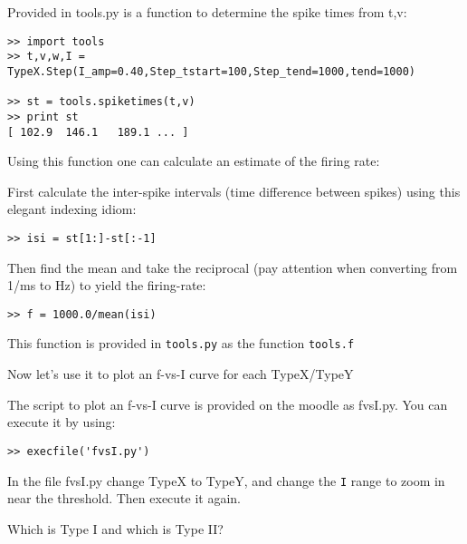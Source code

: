 \documentclass[12pt]{article}
\begin{document}
\begin{Exercise}[]
Provided in tools.py is a function to determine the spike times from
t,v:

\begin{verbatim}
>> import tools
>> t,v,w,I = TypeX.Step(I_amp=0.40,Step_tstart=100,Step_tend=1000,tend=1000)

>> st = tools.spiketimes(t,v)
>> print st
[ 102.9  146.1   189.1 ... ]
\end{verbatim}

Using this function one can calculate an estimate of the firing rate:

First calculate the inter-spike intervals (time difference between
spikes) using this elegant indexing idiom:

\verb^>> isi = st[1:]-st[:-1]^

Then find the mean and take the reciprocal (pay attention when converting from 1/ms to
Hz) to yield the firing-rate:

\begin{verbatim}
>> f = 1000.0/mean(isi)
\end{verbatim}

This function is provided in \verb^tools.py^ as the function \verb^tools.f^

Now let's use it to plot an f-vs-I curve for each TypeX/TypeY

The script to plot an f-vs-I curve is
provided on the moodle as fvsI.py. You can execute it by using:

\begin{verbatim}
>> execfile('fvsI.py')
\end{verbatim}

\Question In the file fvsI.py change TypeX to TypeY, and change the \verb^I^ range to zoom in near the threshold. Then execute it again.

Which is Type I and which is Type II?

\end{Exercise}
\end{document}
